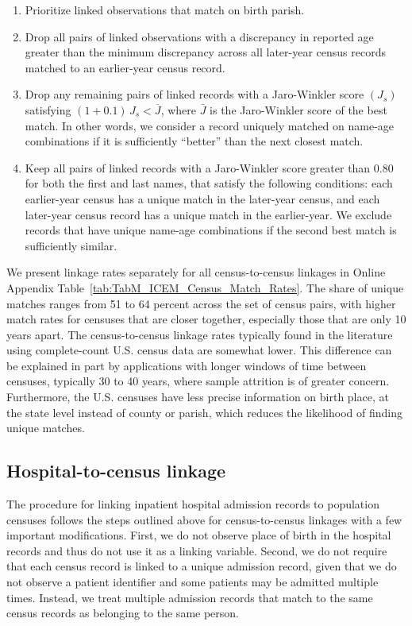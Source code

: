 \documentclass[12pt,english]{article}
\begin{document}
\begin{enumerate}
	\item Prioritize linked observations that match on birth parish.
	\item Drop all pairs of linked observations with a discrepancy in reported age greater than the minimum discrepancy across all later-year census records matched to an earlier-year census record.
	\item Drop any remaining pairs of linked records with a Jaro-Winkler score $(J_{s})$ satisfying $(1+0.1)\,J{}_{s}<\overline{J}$, where $\bar{J}$ is the Jaro-Winkler score of the best match. In other words, we consider a record uniquely matched on name-age combinations if it is sufficiently ``better'' than the next closest match.
	\item Keep all pairs of linked records with a Jaro-Winkler score greater than 0.80 for both the first and last names, that satisfy the following conditions: each earlier-year census has a unique match in the later-year census, and each later-year census record has a unique match in the earlier-year. We exclude records that have unique name-age combinations if the second best match is sufficiently similar.
\end{enumerate}

We present linkage rates separately for all census-to-census linkages in Online Appendix Table~\ref{tab:TabM_ICEM_Census_Match_Rates}. The share of unique matches ranges from 51 to 64 percent across the set of census pairs, with higher match rates for censuses that are closer together, especially those that are only 10 years apart. The census-to-census linkage rates typically found in the literature using complete-count U.S. census data are somewhat lower. This difference can be explained in part by applications with longer windows of time between censuses, typically 30 to 40 years, where sample attrition is of greater concern. Furthermore, the U.S. censuses have less precise information on birth place, at the state level instead of county or parish, which reduces the likelihood of finding unique matches. 

\subsection[Hospital-to-census linkage]{Hospital-to-census linkage\label{sec:linking-hosp-census}}

The procedure for linking inpatient hospital admission records to population censuses follows the steps outlined above for census-to-census linkages with a few important modifications. First, we do not observe place of birth in the hospital records and thus do not use it as a linking variable. Second, we do not require that each census record is linked to a unique admission record, given that we do not observe a patient identifier and some patients may be admitted multiple times. Instead, we treat multiple admission records that match to the same census records as belonging to the same person.
\end{document}
